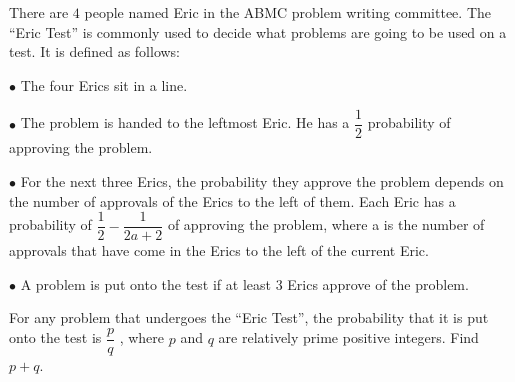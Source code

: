 There are $4$ people named Eric in the ABMC problem writing committee. The ``Eric Test'' is commonly used to decide what problems are going to be used on a test. It is defined as follows:

$\bullet$ The four Erics sit in a line.

$\bullet$  The problem is handed to the leftmost Eric. He has a $\dfrac{1}{2}$ probability of approving the problem.

$\bullet$  For the next three Erics, the probability they approve the problem depends on the number of approvals of the Erics to the left of them. Each Eric has a probability of $\dfrac{1}{2} -\dfrac{1}{2a+2}$ of approving the problem, where a is the number of approvals that have come in the Erics to the left of the current Eric.

$\bullet$  A problem is put onto the test if at least $3$ Erics approve of the problem.

For any problem that undergoes the ``Eric Test'', the probability that it is put onto the test is $\dfrac{p}{q}$ , where $p$ and $q$ are relatively prime positive integers. Find $p + q$.
